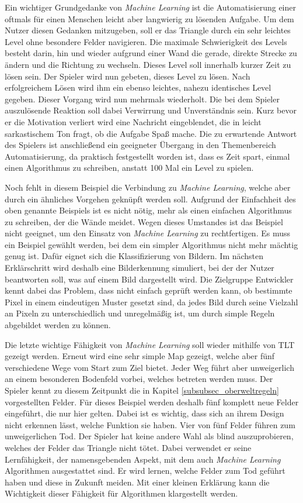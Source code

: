 Ein wichtiger Grundgedanke von \textit{Machine Learning} ist die Automatisierung einer oftmals für einen Menschen leicht aber langwierig zu lösenden Aufgabe. Um dem Nutzer diesen Gedanken mitzugeben, soll er das Triangle durch ein sehr leichtes Level ohne besondere Felder navigieren. Die maximale Schwierigkeit des Levels besteht darin, hin und wieder aufgrund einer Wand die gerade, direkte Strecke zu ändern und die Richtung zu wechseln. Dieses Level soll innerhalb kurzer Zeit zu lösen sein. Der Spieler wird nun gebeten, dieses Level zu lösen. Nach erfolgreichem Lösen wird ihm ein ebenso leichtes, nahezu identisches Level gegeben. Dieser Vorgang wird nun mehrmals wiederholt. Die bei dem Spieler auszulösende Reaktion soll dabei Verwirrung und Unverständnis sein. Kurz bevor er die Motivation verliert wird eine Nachricht eingeblendet, die in leicht sarkastischem Ton fragt, ob die Aufgabe Spaß mache. Die zu erwartende Antwort des Spielers ist anschließend ein geeigneter Übergang in den Themenbereich Automatisierung, da praktisch festgestellt worden ist, dass es Zeit spart, einmal einen Algorithmus zu schreiben, anstatt 100 Mal ein Level zu spielen. 

Noch fehlt in diesem Beispiel die Verbindung zu \textit{Machine Learning}, welche aber durch ein ähnliches Vorgehen geknüpft werden soll. Aufgrund der Einfachheit des oben genannte Beispiels ist es nicht nötig, mehr als einen einfachen Algorithmus zu schreiben, der die Wände meidet. Wegen dieses Umstandes ist das Beispiel nicht geeignet, um den Einsatz von \textit{Machine Learning} zu rechtfertigen. Es muss ein Beispiel gewählt werden, bei dem ein simpler Algorithmus nicht mehr mächtig genug ist. Dafür eignet sich die Klassifizierung von Bildern. Im nächsten Erklärschritt wird deshalb eine Bilderkennung simuliert, bei der der Nutzer beantworten soll, was auf einem Bild dargestellt wird. Die Zielgruppe Entwickler kennt dabei das Problem, dass nicht einfach geprüft werden kann, ob bestimmte Pixel in einem eindeutigen Muster gesetzt sind, da jedes Bild durch seine Vielzahl an Pixeln zu unterschiedlich und unregelmäßig ist, um durch simple Regeln abgebildet werden zu können. 

Die letzte wichtige Fähigkeit von \textit{Machine Learning} soll wieder mithilfe von TLT gezeigt werden. Erneut wird eine sehr simple Map gezeigt, welche aber fünf verschiedene Wege vom Start zum Ziel bietet. Jeder Weg führt aber unweigerlich an einem besonderen Bodenfeld vorbei, welches betreten werden muss. Der Spieler kennt zu diesem Zeitpunkt die in Kapitel \ref{subsubsec_oberweltregeln} vorgestellten Felder. Für dieses Beispiel werden deshalb fünf komplett neue Felder eingeführt, die nur hier gelten. Dabei ist es wichtig, dass sich an ihrem Design nicht erkennen lässt, welche Funktion sie haben. Vier von fünf Felder führen zum unweigerlichen Tod. Der Spieler hat keine andere Wahl als blind auszuprobieren, welches der Felder das Triangle nicht tötet. Dabei verwendet er seine Lernfähigkeit, der namensgebenden Aspekt, mit dem auch \textit{Machine Learning} Algorithmen ausgestattet sind. Er wird lernen, welche Felder zum Tod geführt haben und diese in Zukunft meiden. Mit einer kleinen Erklärung kann die Wichtigkeit dieser Fähigkeit für Algorithmen klargestellt werden.

